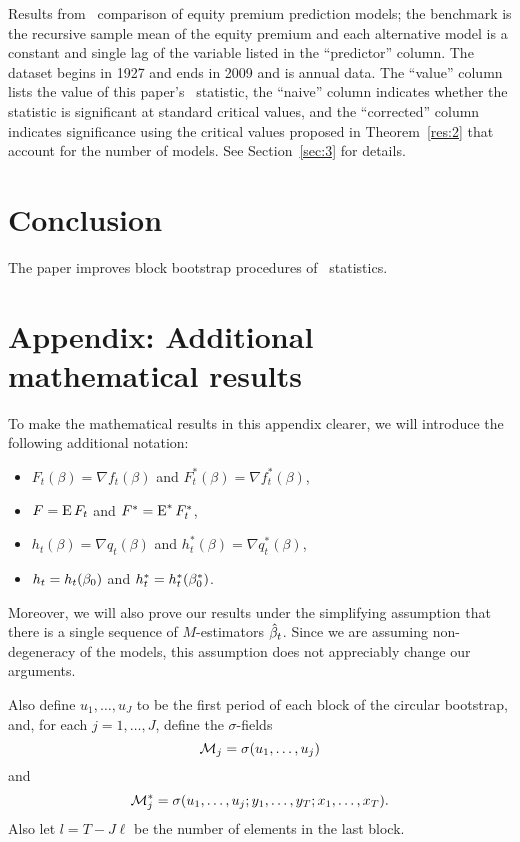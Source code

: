 \documentclass[12pt,fleqn]{article}
\begin{document}
\begin{table}[tb!]
  \centering
  \empiricaltable
\caption{Results from \oos\ comparison of equity premium prediction
  models; the benchmark is the recursive sample mean of the equity
  premium and each alternative model is a constant and single lag of
  the variable listed in the ``predictor'' column.  The dataset begins
  in 1927 and ends in 2009 and is annual data. The ``value'' column
  lists the value of this paper's \oos\ statistic, the ``naive''
  column indicates whether the statistic is significant at standard
  critical values, and the ``corrected'' column indicates significance
  using the critical values proposed in Theorem~\ref{res:2} that
  account for the number of models.  See Section~\ref{sec:3} for details.}
\label{tab:em1}
\end{table}

\section{Conclusion}\label{sec:4}
The paper improves block bootstrap procedures of \oos\
statistics.

\appendix
\section*{Appendix: Additional mathematical results}\label{sec:B}
\renewcommand{\thesubsection}{\Alph{subsection}}

To make the mathematical results in this appendix clearer, we will
introduce the following additional notation:
\begin{itemize}
\item $F_t(\beta) = \nabla f_t(\beta)$ and $F_t^*(\beta) = \nabla f_t^*(\beta)$,
\item $F = \operatorname{E} F_t$ and $F^* = \operatorname{E}^* F_t^*$,
\item $h_t(\beta) = \nabla q_t(\beta)$ and $h_t^*(\beta) = \nabla q_t^*(\beta)$,
\item $h_t = h_t(\beta_0)$ and $h_t^* = h_t^*(\beta_0^*)$.
\end{itemize}

Moreover, we will also prove our results under the simplifying
assumption that there is a single sequence of $M$-estimators
$\hat \beta_t$. Since we are assuming non-degeneracy of the models, this
assumption does not appreciably change our arguments.

Also define $u_1,\dots,u_J$ to be the first period of each
block of the circular bootstrap, and, for each $j = 1,\dots,J$,
define the $\sigma$-fields
\[
\mathcal{M}_j = \sigma(u_1,\dots,u_j)
\]
and
\[
\mathcal{M}_j^* = \sigma(u_1,\dots,u_j; y_1,\dots,y_T; x_1,\dots,x_T).
\]
Also let $l = T - J \ell$ be the number of elements in the last block.
\end{document}
